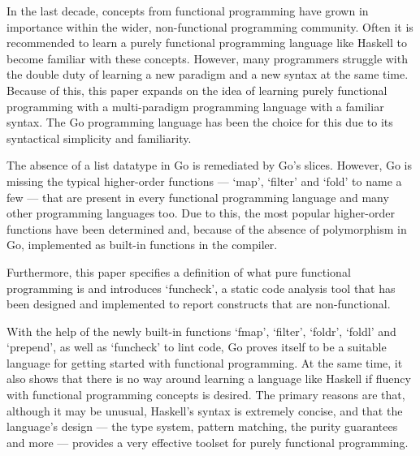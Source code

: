 
In the last decade, concepts from functional programming have grown in
importance within the wider, non-functional programming community.
Often it is recommended to learn a purely functional programming language
like Haskell to become familiar with these concepts.
However, many programmers struggle with the double duty
of learning a new paradigm and a new syntax at the same time. Because of
this, this paper expands on the idea of learning purely functional programming
with a multi-paradigm programming language with a familiar syntax. The Go
programming language has been the choice for this due to its syntactical
simplicity and familiarity.

The absence of a list datatype in Go is remediated by Go's slices.
However, Go is missing the typical higher-order functions ---
`map', `filter' and `fold' to name a few --- that are present in every
functional programming language and many other programming languages too. Due to
this, the most popular higher-order functions have been determined and, because of the
absence of polymorphism in Go, implemented as built-in functions in the compiler.

Furthermore, this paper specifies a definition of what pure functional programming is and
introduces `funcheck', a static code analysis tool that has been designed and implemented to
report constructs that are non-functional.

With the help of the newly built-in functions `fmap', `filter', `foldr', `foldl' and
`prepend', as well as `funcheck' to lint code, Go proves itself to be a
suitable language for getting started with functional programming.
At the same time, it also shows that there is no way around learning a
language like Haskell if fluency with functional programming concepts
is desired. The primary reasons are that, although it may be unusual, Haskell's
syntax is extremely concise, and that the language's design --- the type system,
pattern matching, the purity guarantees and more --- provides a very effective toolset
for purely functional programming.
